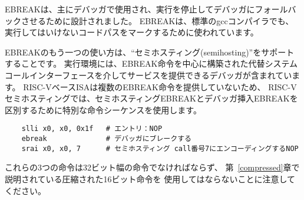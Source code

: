 \begin{commentary}
\begin{comment}
  EBREAK was primarily designed to be used by a debugger to cause
  execution to stop and fall back into the debugger. EBREAK is also
  used by the standard gcc compiler to mark code paths that should not
  be executed.
\end{comment}

EBREAKは、主にデバッガで使用され、実行を停止してデバッガにフォールバックさせるために設計されました。
EBREAKは、標準のgccコンパイラでも、実行してはいけないコードパスをマークするために使われています。

\begin{comment}
  Another use of EBREAK is to support ``semihosting'', where the
  execution environment includes a debugger that can provide services
  over an alternate system call interface built around the EBREAK
  instruction.  Because the RISC-V base ISA does not provide more than
  one EBREAK instruction, RISC-V semihosting uses a special sequence of
  instructions to distinguish a semihosting EBREAK from a debugger
  inserted EBREAK.
\end{comment}
EBREAKのもう一つの使い方は、``セミホスティング(semihosting)''をサポートすることです。
実行環境には、EBREAK命令を中心に構築された代替システムコールインターフェースを介してサービスを提供できるデバッガが含まれています。
RISC-VベースISAは複数のEBREAK命令を提供していないため、
RISC-Vセミホスティングでは、セミホスティングEBREAKとデバッガ挿入EBREAKを
区別するために特別な命令シーケンスを使用します。
\begin{comment}
\begin{verbatim}
    slli x0, x0, 0x1f   # Entry NOP
    ebreak              # Break to debugger
    srai x0, x0, 7      # NOP encoding the semihosting call number 7
\end{verbatim}
\end{comment}
\begin{verbatim}
    slli x0, x0, 0x1f   # エントリ：NOP
    ebreak              # デバッガにブレークする
    srai x0, x0, 7      # セミホスティング call番号7にエンコーディングするNOP
\end{verbatim}
\begin{comment}
   Note that these three instructions must be 32-bit-wide instructions,
   i.e., they mustn't be among the compressed 16-bit instructions
   described in Chapter~\ref{compressed}.
\end{comment}
これらの3つの命令は32ビット幅の命令でなければならず、
第~\ref{compressed}章で説明されている圧縮された16ビット命令を
使用してはならないことに注意してください。


\end{commentary}
